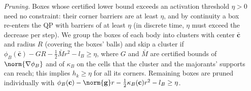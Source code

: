 \emph{Pruning.} Boxes whose certified lower bound exceeds an activation threshold $\eta>0$ need no
constraint: their corner barriers are at least $\eta$, and by continuity a box re-enters the QP with
barriers of at least $\eta$ (in discrete time, $\eta$ must exceed the decrease per step). We group the boxes of
each body into clusters with center $\bar{\mathbf c}$ and radius $R$ (covering the boxes' balls) and
skip a cluster if $\phi_B(\bar{\mathbf c})-GR-\tfrac12\bar M r^2-l_B\ge\eta$, where $G$ and $\bar M$
are certified bounds of $\norm{\nabla\phi_B}$ and of $\kappa_B$ on the cells that the cluster and the
majorants' supports can reach; this implies $h_k\ge\eta$ for all its corners. Remaining boxes are
pruned individually with $\phi_B(\mathbf c)-\norm{\mathbf g}r-\tfrac12\kappa_B(\mathbf c)r^2-l_B\ge\eta$.


